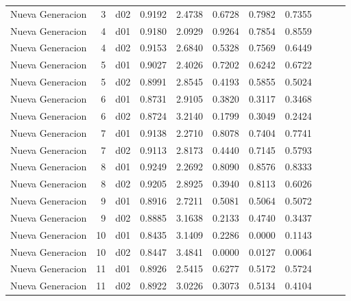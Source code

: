\begin{landscape}
\begin{longtable}{p{2cm}rrrrrrrrrr}
        Nueva Generacion  &          3 &     d02 &   0.9192 &  2.4738 &        0.6728 &           0.7982 &  0.7355 \\
        Nueva Generacion  &          4 &     d01 &   0.9180 &  2.0929 &        0.9264 &           0.7854 &  0.8559 \\
        Nueva Generacion  &          4 &     d02 &   0.9153 &  2.6840 &        0.5328 &           0.7569 &  0.6449 \\
        Nueva Generacion  &          5 &     d01 &   0.9027 &  2.4026 &        0.7202 &           0.6242 &  0.6722 \\
        Nueva Generacion  &          5 &     d02 &   0.8991 &  2.8545 &        0.4193 &           0.5855 &  0.5024 \\
        Nueva Generacion  &          6 &     d01 &   0.8731 &  2.9105 &        0.3820 &           0.3117 &  0.3468 \\
        Nueva Generacion  &          6 &     d02 &   0.8724 &  3.2140 &        0.1799 &           0.3049 &  0.2424 \\
        Nueva Generacion  &          7 &     d01 &   0.9138 &  2.2710 &        0.8078 &           0.7404 &  0.7741 \\
        Nueva Generacion  &          7 &     d02 &   0.9113 &  2.8173 &        0.4440 &           0.7145 &  0.5793 \\
        Nueva Generacion  &          8 &     d01 &   0.9249 &  2.2692 &        0.8090 &           0.8576 &  0.8333 \\
        Nueva Generacion  &          8 &     d02 &   0.9205 &  2.8925 &        0.3940 &           0.8113 &  0.6026 \\
        Nueva Generacion  &          9 &     d01 &   0.8916 &  2.7211 &        0.5081 &           0.5064 &  0.5072 \\
        Nueva Generacion  &          9 &     d02 &   0.8885 &  3.1638 &        0.2133 &           0.4740 &  0.3437 \\
        Nueva Generacion  &         10 &     d01 &   0.8435 &  3.1409 &        0.2286 &           0.0000 &  0.1143 \\
        Nueva Generacion  &         10 &     d02 &   0.8447 &  3.4841 &        0.0000 &           0.0127 &  0.0064 \\
        Nueva Generacion  &         11 &     d01 &   0.8926 &  2.5415 &        0.6277 &           0.5172 &  0.5724 \\
        Nueva Generacion  &         11 &     d02 &   0.8922 &  3.0226 &        0.3073 &           0.5134 &  0.4104 \\

\end{longtable}
\end{landscape}
